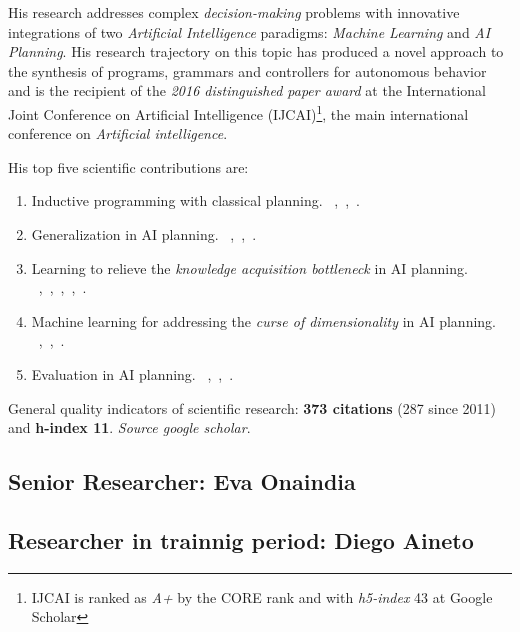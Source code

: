 \documentclass[10pt,a4paper]{paper}
\begin{document}
His research addresses complex {\em decision-making} problems with innovative integrations of two {\em Artificial Intelligence} paradigms: {\em Machine Learning} and {\em AI Planning}. His research trajectory on this topic has produced a novel approach to the synthesis of programs, grammars and controllers for autonomous behavior and is the recipient of the {\it 2016 distinguished paper award} at the International Joint Conference on Artificial Intelligence (IJCAI)\footnote{IJCAI is ranked as {\it A+} by the CORE rank and with {\it h5-index} 43 at Google Scholar}, the main international conference on {\em Artificial intelligence}.

His top five scientific contributions are:
\begin{enumerate}
\item Inductive programming with classical planning. {\footnotesize~\cite{javi-ijcai17},~\cite{segovia2016generalized},~\cite{jimenez2015computing}}.
\item Generalization in AI planning. {\footnotesize~\cite{javi-icaps17},~\cite{damir-derived-ijcai16},~\cite{javi-fsc-ijcai16}}.
\item Learning to relieve the {\it knowledge acquisition bottleneck} in AI planning. {\footnotesize{~\cite{diego-icaps18},~\cite{jimenez2013integrating},~\cite{jimenez2008architecture},~\cite{jimenez2006planning},~\cite{lanchas2007learning}}}.
\item Machine learning for addressing the {\it curse of dimensionality} in AI planning. {\footnotesize~\cite{jimenez2012review},~\cite{de2011scaling},~\cite{de2008learning}}.  
\item Evaluation in AI planning. {\footnotesize~\cite{lopez2015deterministic},~\cite{lopez2013automating},~\cite{coles2012survey}}. 
\end{enumerate}

General quality indicators of scientific research: {\bf 373 citations} (287 since 2011) and {\bf h-index 11}. {\small\em Source google scholar}.


\subsection{Senior Researcher: Eva Onaindia} 

\subsection{Researcher in trainnig period: Diego Aineto}
\end{document}
